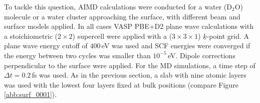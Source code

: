\documentclass[11pt,DIV=13,BCOR=5mm,a4paper,headinclude]{scrbook}
\renewcommand{\vec}[1]{\underline{#1}}
\begin{document}
To tackle this question, AIMD calculations were conducted for a water (D$_2$O) molecule or a water cluster approaching the surface, with different beam and surface models applied.
In all cases VASP PBE+D2 plane wave calculations with a stoichiometric ($2\times 2$) supercell were applied with a ($3\times 3 \times 1$) $\vec{k}$-point grid.
A plane wave energy cutoff of $400\,$eV was used and SCF energies were converged if the energy between two cycles was smaller than $10^{-5}\,$eV.
Dipole corrections perpendicular to the surface were applied.
For the MD simulations, a time step of $\Delta t=0.2\,$fs was used.
As in the previous section, a slab with nine atomic layers was used with the lowest four layers fixed at bulk positions (compare Figure \ref{abb:surf_0001}).

\end{document}
